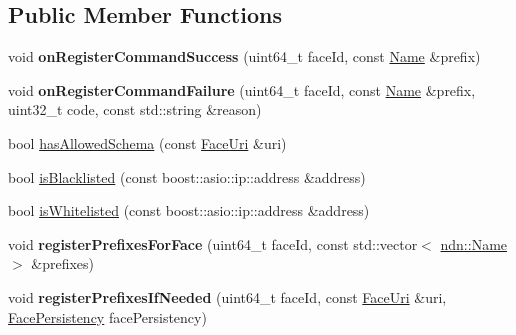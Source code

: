 \subsection*{Public Member Functions}
\begin{DoxyCompactItemize}
\item 
void {\bfseries on\+Register\+Command\+Success} (uint64\+\_\+t face\+Id, const \hyperlink{classndn_1_1Name}{Name} \&prefix)\hypertarget{classndn_1_1nfd__autoreg_1_1AutoregServer_ae8aaaa1de975b318129576d499c74dc8}{}\label{classndn_1_1nfd__autoreg_1_1AutoregServer_ae8aaaa1de975b318129576d499c74dc8}

\item 
void {\bfseries on\+Register\+Command\+Failure} (uint64\+\_\+t face\+Id, const \hyperlink{classndn_1_1Name}{Name} \&prefix, uint32\+\_\+t code, const std\+::string \&reason)\hypertarget{classndn_1_1nfd__autoreg_1_1AutoregServer_a0af091ce03f19bee9681e0590ee5a94d}{}\label{classndn_1_1nfd__autoreg_1_1AutoregServer_a0af091ce03f19bee9681e0590ee5a94d}

\item 
bool \hyperlink{classndn_1_1nfd__autoreg_1_1AutoregServer_a6d35d1f19260bd0c68479c47663d8c25}{has\+Allowed\+Schema} (const \hyperlink{classndn_1_1util_1_1FaceUri}{Face\+Uri} \&uri)
\item 
bool \hyperlink{classndn_1_1nfd__autoreg_1_1AutoregServer_a7e41fa6320ada1a443f73429e871daca}{is\+Blacklisted} (const boost\+::asio\+::ip\+::address \&address)
\item 
bool \hyperlink{classndn_1_1nfd__autoreg_1_1AutoregServer_a20886a49dc0565aa2aacf6793b59187f}{is\+Whitelisted} (const boost\+::asio\+::ip\+::address \&address)
\item 
void {\bfseries register\+Prefixes\+For\+Face} (uint64\+\_\+t face\+Id, const std\+::vector$<$ \hyperlink{classndn_1_1Name}{ndn\+::\+Name} $>$ \&prefixes)\hypertarget{classndn_1_1nfd__autoreg_1_1AutoregServer_ac81f1517d477dbc92354bf8d6290be33}{}\label{classndn_1_1nfd__autoreg_1_1AutoregServer_ac81f1517d477dbc92354bf8d6290be33}

\item 
void {\bfseries register\+Prefixes\+If\+Needed} (uint64\+\_\+t face\+Id, const \hyperlink{classndn_1_1util_1_1FaceUri}{Face\+Uri} \&uri, \hyperlink{group__management_ga05df4b7c484a0fae25d3e65962511bac}{Face\+Persistency} face\+Persistency)\hypertarget{classndn_1_1nfd__autoreg_1_1AutoregServer_a56d02b1830bb324bd079e5710e340a4d}{}\label{classndn_1_1nfd__autoreg_1_1AutoregServer_a56d02b1830bb324bd079e5710e340a4d}


\end{DoxyCompactItemize}
